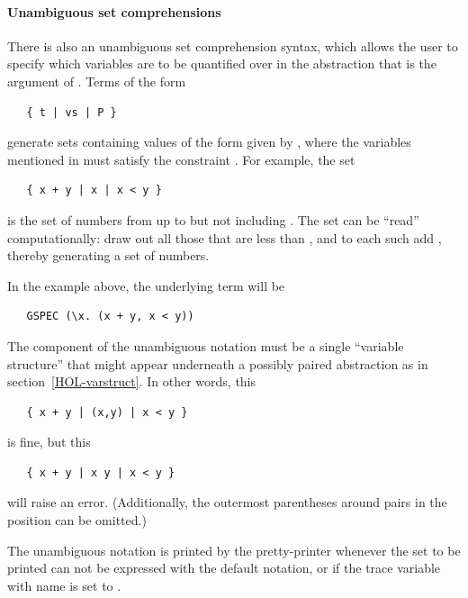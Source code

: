 {\paragraph{Unambiguous set comprehensions} There is also
an unambiguous set comprehension syntax, which allows the user to
specify which variables are to be quantified over in the abstraction
that is the argument of .  Terms of the form
\begin{hol}
\begin{verbatim}
   { t | vs | P }
\end{verbatim}
\end{hol}
generate sets containing values of the form given by , where
the variables mentioned in  must satisfy the constraint
.  For example, the set
\begin{hol}
\begin{verbatim}
   { x + y | x | x < y }
\end{verbatim}
\end{hol}
is the set of numbers from  up to but not including
.  The set can be ``read'' computationally: draw out all
those  that are less than , and to each such
 add , thereby generating a set of numbers.

In the example above, the underlying  term will be
\begin{hol}
\begin{verbatim}
   GSPEC (\x. (x + y, x < y))
\end{verbatim}
\end{hol}

The  component of the unambiguous notation must be a single
``variable structure'' that might appear underneath a possibly paired
abstraction as in section~\ref{HOL-varstruct}.  In other words, this
\begin{hol}
\begin{verbatim}
   { x + y | (x,y) | x < y }
\end{verbatim}
\end{hol}
is fine, but this
\begin{hol}
\begin{verbatim}
   { x + y | x y | x < y }
\end{verbatim}
\end{hol}
will raise an error.  (Additionally, the outermost parentheses around
pairs in the  position can be omitted.)

The unambiguous notation is printed by the pretty-printer whenever the
set to be printed can not be expressed with the default notation, or
if the trace variable with name 
is set to .


}
